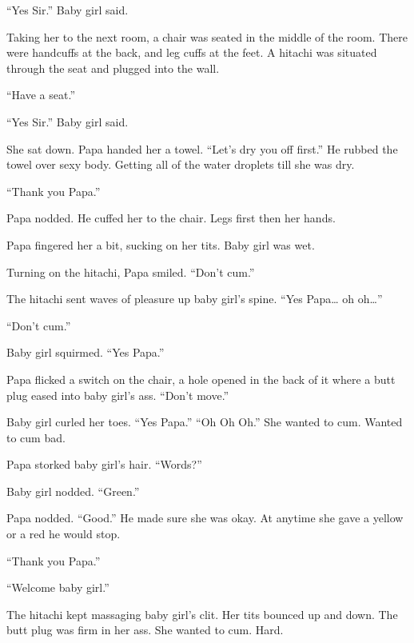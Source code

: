     “Yes Sir.” Baby girl said.

    Taking her to the next room, a chair was seated in the middle of the room. There were handcuffs at the back, and leg cuffs at the feet. A hitachi was situated through the seat and plugged into the wall.

    “Have a seat.”

    “Yes Sir.” Baby girl said.

    She sat down. Papa handed her a towel. “Let’s dry you off first.” He rubbed the towel over sexy body. Getting all of the water droplets till she was dry.

    “Thank you Papa.”

    Papa nodded. He cuffed her to the chair. Legs first then her hands.

    Papa fingered her a bit, sucking on her tits. Baby girl was wet.

    Turning on the hitachi, Papa smiled. “Don’t cum.”

    The hitachi sent waves of pleasure up baby girl’s spine. “Yes Papa… oh oh…”

    “Don’t cum.”

    Baby girl squirmed. “Yes Papa.”

    Papa flicked a switch on the chair, a hole opened in the back of it where a butt plug eased into baby girl’s ass. “Don’t move.”

    Baby girl curled her toes. “Yes Papa.” “Oh Oh Oh.” She wanted to cum. Wanted to cum bad.

    Papa storked baby girl’s hair. “Words?”

    Baby girl nodded. “Green.”

    Papa nodded. “Good.” He made sure she was okay. At anytime she gave a yellow or a red he would stop.

    “Thank you Papa.”

    “Welcome baby girl.”

    The hitachi kept massaging baby girl’s clit. Her tits bounced up and down. The butt plug was firm in her ass. She wanted to cum. Hard.

